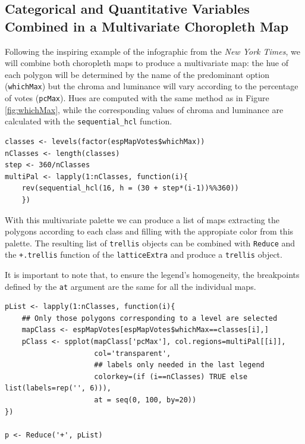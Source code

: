 \documentclass[smallroyalvopaper]{memoir}
\begin{document}
\subsection{\floweroneleft Categorical and Quantitative Variables Combined in a Multivariate Choropleth Map}
\label{sec-1-3}
Following the inspiring example of the infographic from the \emph{New
York Times}, we will combine both choropleth maps to produce a
multivariate map: the hue of each polygon will be determined by
the name of the predominant option (\texttt{whichMax}) but the chroma and
luminance will vary according to the percentage of votes
(\texttt{pcMax}). Hues are computed with the same method as in Figure
\ref{fig:whichMax}, while the corresponding values of chroma and
luminance are calculated with the \texttt{sequential\_hcl} function.

\lstset{language=R,numbers=none}
\begin{lstlisting}
classes <- levels(factor(espMapVotes$whichMax))
nClasses <- length(classes)
step <- 360/nClasses
multiPal <- lapply(1:nClasses, function(i){
    rev(sequential_hcl(16, h = (30 + step*(i-1))%%360))
    })
\end{lstlisting}

With this multivariate palette we can produce a list of maps
extracting the polygons according to each class and filling with
the appropiate color from this palette. The resulting list of
\texttt{trellis} objects can be combined with \texttt{Reduce} and the
\texttt{+.trellis} function of the \texttt{latticeExtra} and produce a \texttt{trellis}
object.

It is important to note that, to ensure the legend's homogeneity, the
breakpoints defined by the \texttt{at} argument are the same for all the
individual maps.

 
\lstset{language=R,numbers=none}
\begin{lstlisting}
pList <- lapply(1:nClasses, function(i){
    ## Only those polygons corresponding to a level are selected
    mapClass <- espMapVotes[espMapVotes$whichMax==classes[i],]
    pClass <- spplot(mapClass['pcMax'], col.regions=multiPal[[i]],
                     col='transparent',
                     ## labels only needed in the last legend
                     colorkey=(if (i==nClasses) TRUE else list(labels=rep('', 6))),
                     at = seq(0, 100, by=20))
})

p <- Reduce('+', pList)
\end{lstlisting}
\end{document}
